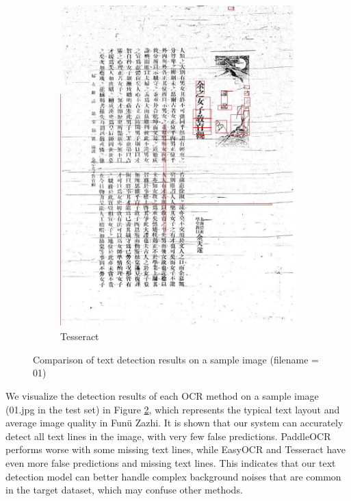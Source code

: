 \documentclass[12pt,twoside]{report}
\begin{document}
\begin{figure}[htbp]
\begin{subfigure}[b]{0.23\linewidth}
        \includegraphics[width=\linewidth]{./figures/samples/tesseract_01.jpg}
        \caption{Tesseract}
        \label{fig:tesseract_01}
    \end{subfigure}
    \caption{Comparison of text detection results on a sample image (filename = 01)}
    \label{fig:detection_compare}
\end{figure}

We visualize the detection results of each OCR method on a sample image (01.jpg in the test set) in Figure \ref{fig:detection_compare}, which represents the typical text layout and average image quality in Funü Zazhi. It is shown that our system can accurately detect all text lines in the image, with very few false predictions. PaddleOCR performs worse with some missing text lines, while EasyOCR and Tesseract have even more false predictions and missing text lines. This indicates that our text detection model can better handle complex background noises that are common in the target dataset, which may confuse other methods.
\end{document}
